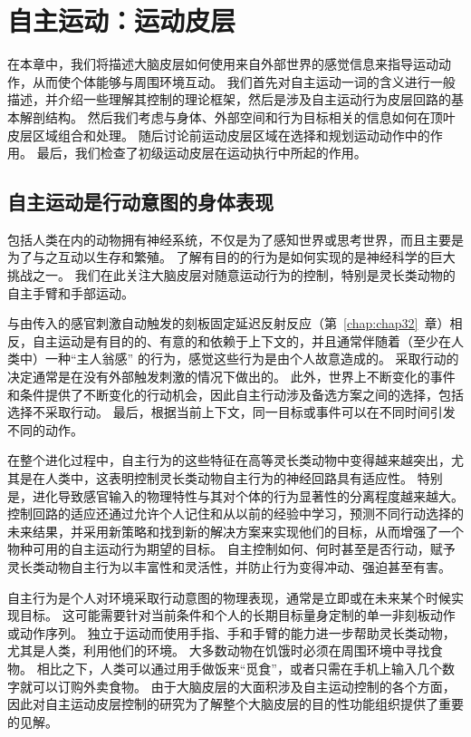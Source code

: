 \chapter{自主运动：运动皮层} \label{chap:chap34}




在本章中，我们将描述大脑皮层如何使用来自外部世界的感觉信息来指导运动动作，从而使个体能够与周围环境互动。
我们首先对自主运动一词的含义进行一般描述，并介绍一些理解其控制的理论框架，然后是涉及自主运动行为皮层回路的基本解剖结构。
然后我们考虑与身体、外部空间和行为目标相关的信息如何在顶叶皮层区域组合和处理。
随后讨论前运动皮层区域在选择和规划运动动作中的作用。
最后，我们检查了初级运动皮层在运动执行中所起的作用。



\section{自主运动是行动意图的身体表现}

包括人类在内的动物拥有神经系统，不仅是为了感知世界或思考世界，而且主要是为了与之互动以生存和繁殖。
了解有目的的行为是如何实现的是神经科学的巨大挑战之一。
我们在此关注大脑皮层对随意运动行为的控制，特别是灵长类动物的自主手臂和手部运动。


与由传入的感官刺激自动触发的刻板固定延迟反射反应（第~\ref{chap:chap32}~章）相反，自主运动是有目的的、有意的和依赖于上下文的，并且通常伴随着（至少在人类中）一种“主人翁感” 的行为，感觉这些行为是由个人故意造成的。
采取行动的决定通常是在没有外部触发刺激的情况下做出的。
此外，世界上不断变化的事件和条件提供了不断变化的行动机会，因此自主行动涉及备选方案之间的选择，包括选择不采取行动。
最后，根据当前上下文，同一目标或事件可以在不同时间引发不同的动作。


在整个进化过程中，自主行为的这些特征在高等灵长类动物中变得越来越突出，尤其是在人类中，这表明控制灵长类动物自主行为的神经回路具有适应性。
特别是，进化导致感官输入的物理特性与其对个体的行为显著性的分离程度越来越大。
控制回路的适应还通过允许个人记住和从以前的经验中学习，预测不同行动选择的未来结果，并采用新策略和找到新的解决方案来实现他们的目标，从而增强了一个物种可用的自主运动行为期望的目标。
自主控制如何、何时甚至是否行动，赋予灵长类动物自主行为以丰富性和灵活性，并防止行为变得冲动、强迫甚至有害。


自主行为是个人对环境采取行动意图的物理表现，通常是立即或在未来某个时候实现目标。
这可能需要针对当前条件和个人的长期目标量身定制的单一非刻板动作或动作序列。
独立于运动而使用手指、手和手臂的能力进一步帮助灵长类动物，尤其是人类，利用他们的环境。
大多数动物在饥饿时必须在周围环境中寻找食物。
相比之下，人类可以通过用手做饭来“觅食”，或者只需在手机上输入几个数字就可以订购外卖食物。
由于大脑皮层的大面积涉及自主运动控制的各个方面，因此对自主运动皮层控制的研究为了解整个大脑皮层的目的性功能组织提供了重要的见解。



